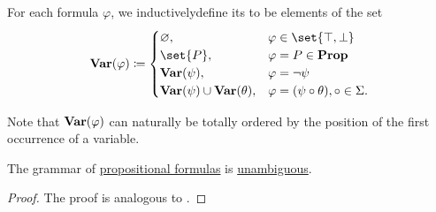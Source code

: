 \begin{definition}
\begin{thmenum}
     For each formula \( \varphi \), we inductively\IND define its  to be elements of the set
    \begin{equation}\label{eq:def:propositional_syntax/varables}
      \boldop{Var}(\varphi) \coloneqq \begin{cases}
        \varnothing,                              &\varphi \in \set{ \top, \bot }                     \\
        \set{ P },                                  &\varphi = P \in \boldop{Prop}                      \\
        \boldop{Var}(\psi),                         &\varphi = \neg \psi                              \\
        \boldop{Var}(\psi) \cup \boldop{Var}(\theta), &\varphi = (\psi \circ \theta), \circ \in \Sigma.
      \end{cases}
    \end{equation}

    Note that \( \operatorname{\mathbf{Var}}(\varphi) \) can naturally be totally ordered by the position of the first occurrence of a variable.
  \end{thmenum}
\end{definition}

\begin{proposition}\label{thm:propositional_formulas_are_unambiguous}
  The grammar of \hyperref[def:propositional_syntax/formula]{propositional formulas} is \hyperref[def:grammar_derivation/ambiguity]{unambiguous}.
\end{proposition}
\begin{proof}
  The proof is analogous to .
\end{proof}


